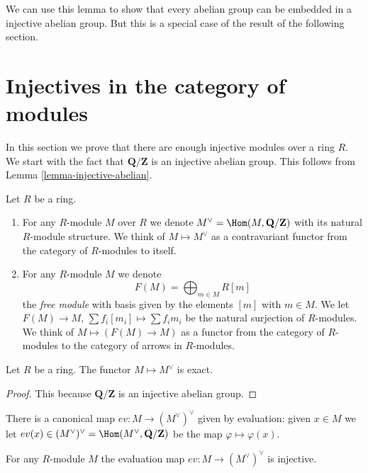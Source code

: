 \noindent
We can use this lemma to show that every abelian
group can be embedded in a injective abelian
group. But this is a special case of the result of
the following section.





\section{Injectives in the category of modules}
\label{section-injectives-modules}

\noindent
In this section we prove that there are enough injective modules over a ring
$R$. We start with the fact that $\mathbf{Q}/\mathbf{Z}$ is an injective
abelian group. This follows from Lemma \ref{lemma-injective-abelian}.

\begin{definition}
\label{definition-simple-functors}
Let $R$ be a ring.
\begin{enumerate}
\item For any $R$-module $M$ over $R$ we denote
$M^\vee = \Hom(M, \mathbf{Q}/\mathbf{Z})$
with its natural $R$-module structure. We think
of {\it $M \mapsto M^\vee$} as a contravariant functor
from the category of $R$-modules to itself.
\item For any $R$-module $M$ we denote
$$
F(M) = \bigoplus\nolimits_{m \in M} R[m]
$$
the {\it free module} with basis given by the elements $[m]$ with
$m \in M$. We let $F(M)\to M$, $\sum f_i [m_i] \mapsto \sum f_i m_i$
be the natural surjection of $R$-modules.
We think of $M \mapsto (F(M) \to M)$ as a functor from
the category of $R$-modules to the category of
arrows in $R$-modules.
\end{enumerate}
\end{definition}

\begin{lemma}
\label{lemma-vee-exact}
Let $R$ be a ring.
The functor $M \mapsto M^\vee$ is exact.
\end{lemma}

\begin{proof}
This because $\mathbf{Q}/\mathbf{Z}$
is an injective abelian group.
\end{proof}

\noindent
There is a canonical map $ev : M \to (M^\vee)^\vee$
given by evaluation: given $x \in M$ we let
$ev(x) \in (M^\vee)^\vee = \Hom(M^\vee, \mathbf{Q}/\mathbf{Z})$
be the map $\varphi \mapsto \varphi(x)$.

\begin{lemma}
\label{lemma-ev-injective}
For any $R$-module $M$ the evaluation map
$ev : M \to (M^\vee)^\vee$ is injective.
\end{lemma}


